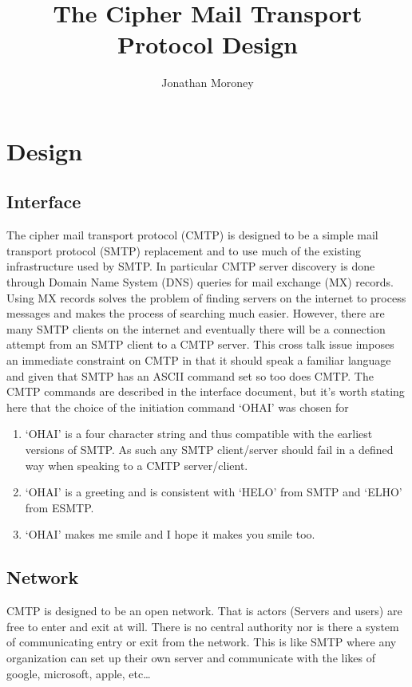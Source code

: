 \documentclass[a4paper,11pt]{article}
\title{The Cipher Mail Transport Protocol Design}
\author{Jonathan Moroney}
\begin{document}
\maketitle
\section{Design}
\subsection{Interface}
The cipher mail transport protocol (CMTP) is designed to be a simple mail transport protocol (SMTP) replacement and to use much of the existing infrastructure used by SMTP. In particular CMTP server discovery is done through Domain Name System (DNS) queries for mail exchange (MX) records. Using MX records solves the problem of finding servers on the internet to process messages and makes the process of searching much easier. However, there are many SMTP clients on the internet and eventually there will be a connection attempt from an SMTP client to a CMTP server. This cross talk issue imposes an immediate constraint on CMTP in that it should speak a familiar language and given that SMTP has an ASCII command set so too does CMTP. The CMTP commands are described in the interface document, but it's worth stating here that the choice of the initiation command `OHAI' was chosen for 
\begin{enumerate}
  \item `OHAI' is a four character string and thus compatible with the earliest versions of SMTP. As such any SMTP client/server should fail in a defined way when speaking to a CMTP server/client.
  \item `OHAI' is a greeting and is consistent with `HELO' from SMTP and `ELHO' from ESMTP.
  \item `OHAI' makes me smile and I hope it makes you smile too.
\end{enumerate}
\subsection{Network}
CMTP is designed to be an open network. That is actors (Servers and users) are free to enter and exit at will. There is no central authority nor is there a system of communicating entry or exit from the network. This is like SMTP where any organization can set up their own server and communicate with the likes of google, microsoft, apple, etc\ldots
\end{document}
